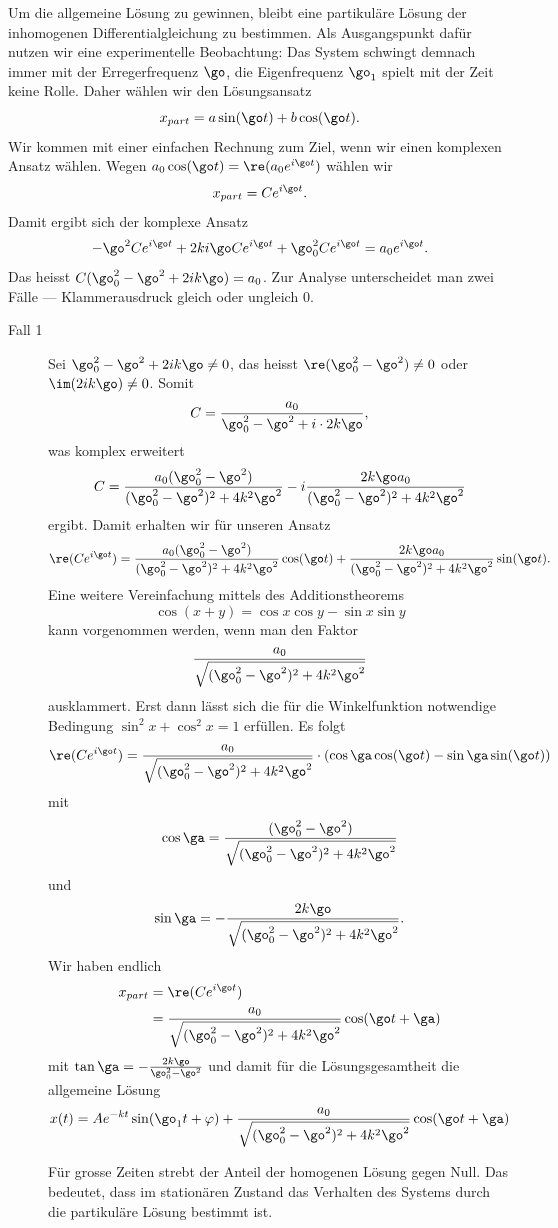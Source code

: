 \documentclass[%
draft,
11pt,%
twoside,%
titlepage,%
german,%
headsepline%
]{scrartcl}
\begin{document}
Um die allgemeine L\"osung zu gewinnen, bleibt eine partikul\"are L\"osung der inhomogenen Differentialgleichung zu bestimmen. Als Ausgangspunkt daf\"ur nutzen wir eine experimentelle Beobachtung: Das System schwingt demnach immer mit der Erregerfrequenz $\go$, die Eigenfrequenz $\go_1$ spielt mit der Zeit keine Rolle. Daher w\"ahlen wir den L\"osungsansatz
$$x_{part}=a\sin(\go t)+b\cos(\go t).$$
Wir kommen mit einer einfachen Rechnung zum Ziel, wenn wir einen komplexen Ansatz w\"ahlen. Wegen $a_0\cos(\go t)=\re(a_0e^{i\go t})$ w\"ahlen wir
$$x_{part}=Ce^{i\go t}.$$
Damit ergibt sich der komplexe Ansatz
$$-\go^2Ce^{i\go t}+2ki\go Ce^{i\go t}+\go_0^2Ce^{i\go t}=a_0e^{i\go t}.$$
Das heisst $C(\go_0^2-\go^2+2ik\go)=a_0$. Zur Analyse unterscheidet man zwei F\"alle --- Klammerausdruck gleich oder ungleich $0$.

\begin{description}
\item[Fall 1] Sei $\go_0^2-\go^2+2ik\go\neq0$, das heisst $\re(\go_0^2-\go^2)\neq0$ oder $\im(2ik\go)\neq0$. Somit
$$C=\frac{a_0}{\go_0^2-\go^2+i\cdot 2k\go},$$
was komplex erweitert
$$
C=\frac{a_0(\go_0^2-\go^2)}{(\go_0^2-\go^2)^2+4k^2\go^2}-i\frac{2k\go a_0}{(\go_0^2-\go^2)^2+4k^2\go^2}
$$
ergibt. Damit erhalten wir f\"ur unseren Ansatz
$$
\re(Ce^{i\go t})=\frac{a_0(\go_0^2-\go^2)}{(\go_0^2-\go^2)^2+4k^2\go^2}\cos(\go t)+\frac{2k\go a_0}{(\go_0^2-\go^2)^2+4k^2\go^2}\sin(\go t).
$$
Eine weitere Vereinfachung mittels des Additionstheorems
$$\cos(x+y)=\cos x\cos y-\sin x\sin y$$
kann vorgenommen werden, wenn man den Faktor
$$\frac{a_0}{\sqrt{(\go_0^2-\go^2)^2+4k^2\go^2}}$$
ausklammert. Erst dann l\"asst sich die f\"ur die Winkelfunktion notwendige Bedingung $\sin^2x+\cos^2x=1$ erf\"ullen. Es folgt
$$
\re(Ce^{i\go t})=\frac{a_0}{\sqrt{(\go_0^2-\go^2)^2+4k^2\go^2}}\cdot(\cos\ga\cos(\go t)-\sin\ga\sin(\go t))
$$
mit
$$\cos\ga=\frac{(\go_0^2-\go^2)}{\sqrt{(\go_0^2-\go^2)^2+4k^2\go^2}}$$
und
$$\sin\ga=-\frac{2k\go}{\sqrt{(\go_0^2-\go^2)^2+4k^2\go^2}}.$$
Wir haben endlich
\begin{align*}
x_{part}&=\re(Ce^{i\go t})\\
&=\frac{a_0}{\sqrt{(\go_0^2-\go^2)^2+4k^2\go^2}}\cos(\go t+\ga)
\end{align*}
mit $\tan\ga=-\frac{2k\go}{\go_0^2-\go^2}$ und damit f\"ur die L\"osungsgesamtheit die allgemeine L\"osung
$$
x(t)=Ae^{-kt}\sin(\go_1 t+\varphi)+\frac{a_0}{\sqrt{(\go_0^2-\go^2)^2+4k^2\go^2}}\cos(\go t+\ga)
$$

\begin{bem}
F\"ur grosse Zeiten strebt der Anteil der homogenen L\"osung gegen Null. Das bedeutet, dass im station\"aren Zustand das Verhalten des Systems durch die partikul\"are L\"osung bestimmt ist.
\end{bem}


\end{description}
\end{document}
